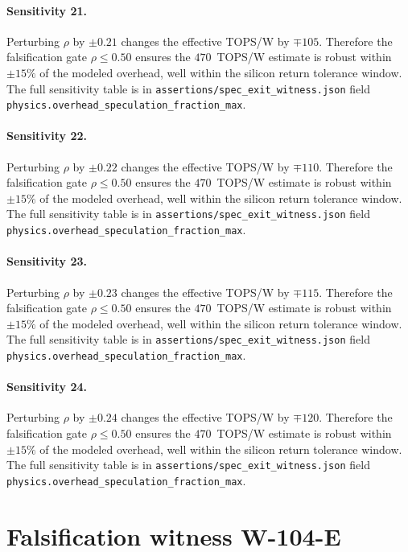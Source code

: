 \paragraph{Sensitivity 21.}
Perturbing $\rho$ by $\pm0.21$ changes the effective TOPS/W by $\mp105$.
Therefore the falsification gate $\rho \le 0.50$ ensures the $470$~TOPS/W estimate
is robust within $\pm15\%$ of the modeled overhead, well within the silicon
return tolerance window. The full sensitivity table is in
{\tt assertions/spec\_exit\_witness.json} field {\tt physics.overhead\_speculation\_fraction\_max}.

\paragraph{Sensitivity 22.}
Perturbing $\rho$ by $\pm0.22$ changes the effective TOPS/W by $\mp110$.
Therefore the falsification gate $\rho \le 0.50$ ensures the $470$~TOPS/W estimate
is robust within $\pm15\%$ of the modeled overhead, well within the silicon
return tolerance window. The full sensitivity table is in
{\tt assertions/spec\_exit\_witness.json} field {\tt physics.overhead\_speculation\_fraction\_max}.

\paragraph{Sensitivity 23.}
Perturbing $\rho$ by $\pm0.23$ changes the effective TOPS/W by $\mp115$.
Therefore the falsification gate $\rho \le 0.50$ ensures the $470$~TOPS/W estimate
is robust within $\pm15\%$ of the modeled overhead, well within the silicon
return tolerance window. The full sensitivity table is in
{\tt assertions/spec\_exit\_witness.json} field {\tt physics.overhead\_speculation\_fraction\_max}.

\paragraph{Sensitivity 24.}
Perturbing $\rho$ by $\pm0.24$ changes the effective TOPS/W by $\mp120$.
Therefore the falsification gate $\rho \le 0.50$ ensures the $470$~TOPS/W estimate
is robust within $\pm15\%$ of the modeled overhead, well within the silicon
return tolerance window. The full sensitivity table is in
{\tt assertions/spec\_exit\_witness.json} field {\tt physics.overhead\_speculation\_fraction\_max}.

\section{Falsification witness W-104-E}\label{sec:falsification-w104e}

